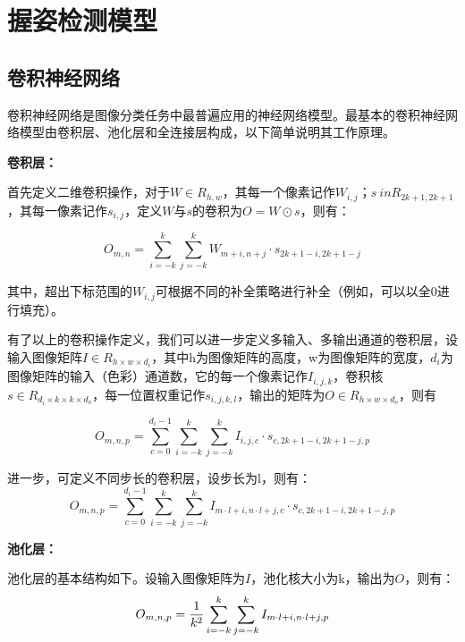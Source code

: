 \section{握姿检测模型}
\label{cha:grip}

\subsection{卷积神经网络}
卷积神经网络是图像分类任务中最普遍应用的神经网络模型。最基本的卷积神经网络模型由卷积层、池化层和全连接层构成，以下简单说明其工作原理。

\textbf{卷积层：}

首先定义二维卷积操作，对于$W \in R_{h,w}$，其每一个像素记作$W_{i,j}$；$s \ in R_{2k+1,2k+1}$，其每一像素记作$s_{i,j}$，定义$W$与$s$的卷积为$O = W \odot s$，则有：

\begin{equation}
    O_{m,n} = \sum\limits_{i = -k}^k \sum\limits_{j = -k}^k W_{m+i,n+j} \cdot s_{2k+1-i, 2k+1-j}
\end{equation}

其中，超出下标范围的$W_{i,j}$可根据不同的补全策略进行补全（例如，可以以全0进行填充）。

有了以上的卷积操作定义，我们可以进一步定义多输入、多输出通道的卷积层，设输入图像矩阵$I \in R_{h \times w \times d_i}$，其中h为图像矩阵的高度，w为图像矩阵的宽度，$d_i$为图像矩阵的输入（色彩）通道数，它的每一个像素记作$I_{i,j,k}$，卷积核$s \in R_{d_i \times k \times k \times d_o}$，每一位置权重记作$s_{i,j,k,l}$，输出的矩阵为$O \in R_{h \times w \times d_o}$，则有

\begin{equation}
    O_{m,n,p} = \sum\limits_{c = 0}^{d_i - 1} \sum\limits_{i = -k}^k \sum\limits_{j = -k}^k I_{i,j,c} \cdot s_{c, 2k+1-i, 2k+1-j, p}
\end{equation}

进一步，可定义不同步长的卷积层，设步长为l，则有：
\begin{equation}
    O_{m,n,p} = \sum\limits_{c = 0}^{d_i - 1} \sum\limits_{i = -k}^k \sum\limits_{j = -k}^k I_{m \cdot l+i,n \cdot l+j,c} \cdot s_{c, 2k+1-i, 2k+1-j, p}
\end{equation}


\textbf{池化层：}

池化层的基本结构如下。设输入图像矩阵为$I$，池化核大小为k，输出为$O$，则有：
\begin{equation}
    O_{m,n,p} =  {1 \over k^2} \sum\limits_{i = -k}^k \sum\limits_{j = -k}^k I_{m \cdot l+i,n \cdot l+j,p}
\end{equation}

